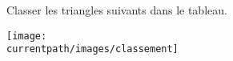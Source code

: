 \begin{exercice}
    Classer les triangles suivants dans le tableau.
    \begin{center}
       \texttt{[image: \\currentpath/images/classement]}
    \end{center}
    \vspace*{-5mm}
\end{exercice}
